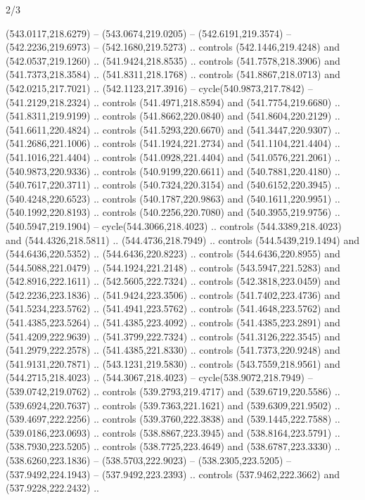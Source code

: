 \begin{flagdescription}{2/3}
\begin{scope}[xshift=0.5\flaglength,yshift=0.5\flagwidth,scale=\flagwidth/495.65]
\begin{scope}[y=0.8pt, x=0.8pt, yscale=-1,shift={(-463.76,-309.78)}]
  (543.0117,218.6279) -- (543.0674,219.0205) -- (542.6191,219.3574) --
  (542.2236,219.6973) -- (542.1680,219.5273) .. controls (542.1446,219.4248) and
  (542.0537,219.1260) .. (541.9424,218.8535) .. controls (541.7578,218.3906) and
  (541.7373,218.3584) .. (541.8311,218.1768) .. controls (541.8867,218.0713) and
  (542.0215,217.7021) .. (542.1123,217.3916) -- cycle(540.9873,217.7842) --
  (541.2129,218.2324) .. controls (541.4971,218.8594) and (541.7754,219.6680) ..
  (541.8311,219.9199) .. controls (541.8662,220.0840) and (541.8604,220.2129) ..
  (541.6611,220.4824) .. controls (541.5293,220.6670) and (541.3447,220.9307) ..
  (541.2686,221.1006) .. controls (541.1924,221.2734) and (541.1104,221.4404) ..
  (541.1016,221.4404) .. controls (541.0928,221.4404) and (541.0576,221.2061) ..
  (540.9873,220.9336) .. controls (540.9199,220.6611) and (540.7881,220.4180) ..
  (540.7617,220.3711) .. controls (540.7324,220.3154) and (540.6152,220.3945) ..
  (540.4248,220.6523) .. controls (540.1787,220.9863) and (540.1611,220.9951) ..
  (540.1992,220.8193) .. controls (540.2256,220.7080) and (540.3955,219.9756) ..
  (540.5947,219.1904) -- cycle(544.3066,218.4023) .. controls
  (544.3389,218.4023) and (544.4326,218.5811) .. (544.4736,218.7949) .. controls
  (544.5439,219.1494) and (544.6436,220.5352) .. (544.6436,220.8223) .. controls
  (544.6436,220.8955) and (544.5088,221.0479) .. (544.1924,221.2148) .. controls
  (543.5947,221.5283) and (542.8916,222.1611) .. (542.5605,222.7324) .. controls
  (542.3818,223.0459) and (542.2236,223.1836) .. (541.9424,223.3506) .. controls
  (541.7402,223.4736) and (541.5234,223.5762) .. (541.4941,223.5762) .. controls
  (541.4648,223.5762) and (541.4385,223.5264) .. (541.4385,223.4092) .. controls
  (541.4385,223.2891) and (541.4209,222.9639) .. (541.3799,222.7324) .. controls
  (541.3126,222.3545) and (541.2979,222.2578) .. (541.4385,221.8330) .. controls
  (541.7373,220.9248) and (541.9131,220.7871) .. (543.1231,219.5830) .. controls
  (543.7559,218.9561) and (544.2715,218.4023) .. (544.3067,218.4023) --
  cycle(538.9072,218.7949) -- (539.0742,219.0762) .. controls
  (539.2793,219.4717) and (539.6719,220.5586) .. (539.6924,220.7637) .. controls
  (539.7363,221.1621) and (539.6309,221.9502) .. (539.4697,222.2256) .. controls
  (539.3760,222.3838) and (539.1445,222.7588) .. (539.0186,223.0693) .. controls
  (538.8867,223.3945) and (538.8164,223.5791) .. (538.7930,223.5205) .. controls
  (538.7725,223.4649) and (538.6787,223.3330) .. (538.6260,223.1836) --
  (538.5703,222.9023) -- (538.2305,223.5205) -- (537.9492,224.1943) --
  (537.9492,223.2393) .. controls (537.9462,222.3662) and (537.9228,222.2432) ..

\end{scope}
\end{scope}
\end{flagdescription}
